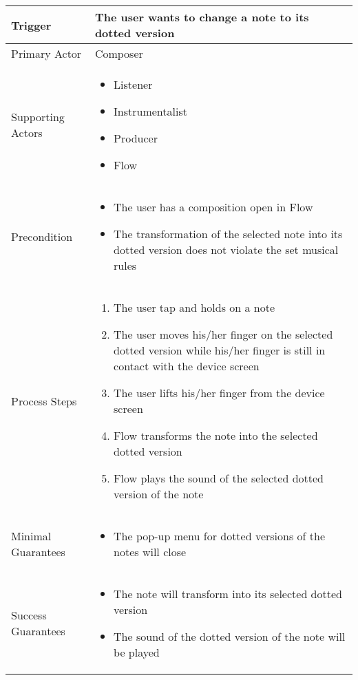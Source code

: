 \begin{longtable}{|X|X|}
\hline
Trigger & 
The user wants to change a note to its dotted version \\
\hline
Primary Actor & 
Composer \\
\hline
Supporting Actors & 
\begin{itemize}
\item Listener
\item Instrumentalist
\item Producer
\item Flow
\end{itemize} \\
\hline
Precondition & 
\begin{itemize}
\item The user has a composition open in Flow
\item The transformation of the selected note into its dotted version does not violate the set musical rules
\end{itemize} \\
\hline
Process Steps & 
\begin{enumerate}
\item The user tap and holds on a note
\item The user moves his/her finger on the selected dotted version while his/her finger is still in contact with the device screen
\item The user lifts his/her finger from the device screen
\item Flow transforms the note into the selected dotted version
\item Flow plays the sound of the selected dotted version of the note
\end{enumerate} \\
\hline
Minimal Guarantees & 
\begin{itemize}
  \item The pop-up menu for dotted versions of the notes will close
\end{itemize} \\
\hline
Success Guarantees & 
\begin{itemize}
  \item The note will transform into its selected dotted version
  \item The sound of the dotted version of the note will be played 
\end{itemize} \\
\hline
\end{longtable}